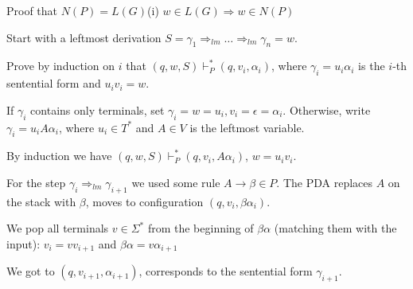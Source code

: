 \documentclass[handout]{beamer}
\begin{document}
\begin{frame}{Proof that $N(P)=L(G)$\hfill \alert{(i) $w\in L(G)\Rightarrow w\in N(P)$}}

    Start with a leftmost derivation $S=\gamma_1\Rightarrow_{lm}\ldots\Rightarrow_{lm}\gamma_n=w$.

    Prove by induction on $i$ that $(q,w,S)\vdash_P^* (q, v_i,\alpha_i)$, where $\gamma_i=u_i\alpha_i$ is the $i$-th sentential form and $u_iv_i=w$.

    If $\gamma_i$ contains only terminals, set $\gamma_i=w=u_i, v_i=\epsilon=\alpha_i$. Otherwise, write $\gamma_i=u_iA\alpha_i$, where $u_i\in T^*$ and $A\in V$ is the leftmost variable.

    By induction we have $(q,w,S)\vdash_P^* (q, v_i,A\alpha_i)$, $w=u_iv_i$.

    For the step $\gamma_i\Rightarrow_{lm}\gamma_{i+1}$ we used some rule $A\rightarrow\beta\in P$. The PDA replaces $A$ on the stack with $\beta$, moves to configuration $(q,v_i,\beta\alpha_i)$.

    We pop all terminals $v\in \Sigma^*$ from the beginning of $\beta\alpha$ (matching them with the input): $v_i=vv_{i+1}$ and $\beta\alpha=v\alpha_{i+1}$

    We got to $(q,v_{i+1},\alpha_{i+1})$, corresponds to the sentential form $\gamma_{i+1}$.
    
\end{frame}
\end{document}
